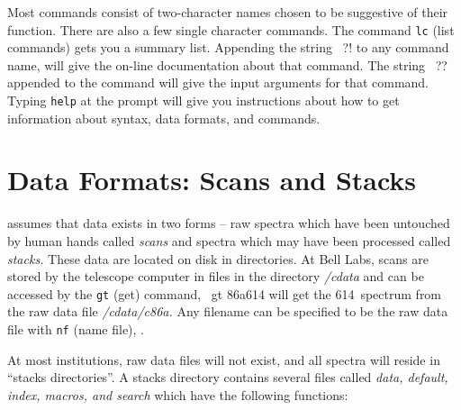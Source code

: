 Most \COMB commands consist of
two-character names chosen to be suggestive of their function.
There are also a few single character commands.
The command {\tt lc} (list commands) gets you a summary list.
Appending the string {\us\ ?!} to any command name, will give
the on-line documentation about that command. The string {\us\ ??} appended to the
command will give the input arguments for that command.
\smallskip
{}
\smallskip\noindent
Typing {\tt help} at the \COMB prompt will give 
you instructions about how to get information about syntax,
data formats, and commands.  

\section{Data Formats: Scans and Stacks}
\label{sec-data}

\COMB assumes that data exists in two forms -- raw spectra which have
been untouched by human hands called {\em scans\/} and spectra which
may have been processed called {\em stacks.}  These data are located on disk
in directories.  At Bell Labs, scans are stored by the telescope computer in files
in the directory {\sl /cdata\/} and can be accessed by the {\tt gt} (get) 
command, \eg\ {\us gt 86a614} will get the 614\uth\ spectrum from the raw data file
{\sl /cdata/c86a.}
Any filename can be specified to be the raw data file with {\tt nf} (name file),
.  

At most institutions, raw data files will not exist, 
and all spectra will reside in ``stacks directories''.  
A stacks directory contains several files called {\sl data, default,
index, macros, {\rm and} search\/} which have the following functions:
\smallskip
{}
\smallskip

